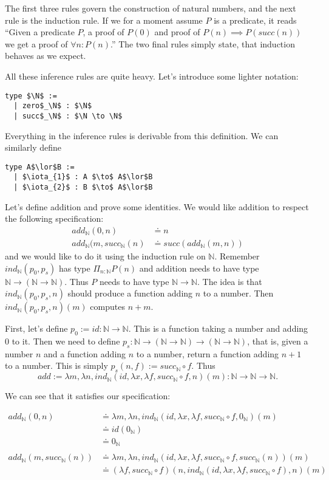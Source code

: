 \documentclass[a4paper, 12pt]{article}
\newcommand{\N}{\mathbb{N}}
\theoremstyle{changedot}
\theoremstyle{changedotbreak}
\theoremstyle{nonumberplain}
\begin{document}
The first three rules govern the construction of natural numbers, and the next rule is the induction rule. If we for a moment assume $P$ is a predicate, it reads ``Given a predicate $P$, a proof of $P(0)$ and proof of $P(n) \implies P(succ(n))$ we get a proof of $\forall n: P(n)$.'' The two final rules simply state, that induction behaves as we expect.

All these inference rules are quite heavy. Let's introduce some lighter notation:

\begin{lstlisting}[mathescape=true]
  type $\N$ :=
  | zero$_\N$ : $\N$
  | succ$_\N$ : $\N \to \N$
\end{lstlisting}

Everything in the inference rules is derivable from this definition. We can similarly define

\begin{lstlisting}[mathescape=true]
  type A$\lor$B :=
  | $\iota_{1}$ : A $\to$ A$\lor$B
  | $\iota_{2}$ : B $\to$ A$\lor$B
\end{lstlisting}

Let's define addition and prove some identities. We would like addition to respect the following specification:
\begin{align*}
  \mathit{add}_{\N} (0, n) &\doteq n \\
  \mathit{add}_{\N} (m, succ_{\N} (n) &\doteq succ(\mathit{add}_{\N}(m, n))
\end{align*}
and we would like to do it using the induction rule on $\N$. Remember $ind_{\N}(p_{0}, p_{s})$ has type $\Pi_{n:\N} P(n)$ and addition needs to have type $\N \to (\N \to \N)$. Thus $P$ needs to have type $\N \to \N$. The idea is that $ind_{\N}(p_{0}, p_{s}, n)$ should produce a function adding $n$ to a number. Then $ind_{\N}(p_{0}, p_{s}, n)(m)$ computes $n+m$.

First, let's define $p_{0} := id : \N \to \N$. This is a function taking a number and adding 0 to it. Then we need to define $p_{s} : \N \to (\N \to \N) \to (\N \to \N)$, that is, given a number $n$ and a function adding $n$ to a number, return a function adding $n+1$ to a number. This is simply $p_{s}(n, f) := succ_{\N} \circ f$. Thus \[add := \lambda m, \lambda n, ind_{\N}(id, \lambda x, \lambda f, succ_{\N} \circ f, n)(m) : \N \to \N \to \N.\]

We can see that it satisfies our specification:

\begin{align*}
  add_{\N}(0, n) &\doteq \lambda m, \lambda n, ind_{\N}(id, \lambda x, \lambda f, succ_{\N} \circ f, 0_{\N})(m) \\
                 &\doteq id(0_{\N}) \\
                 &\doteq 0_{\N} \\ \\
  add_{\N}(m, succ_{\N}(n)) &\doteq \lambda m, \lambda n, ind_{\N}(id, \lambda x, \lambda f, succ_{\N} \circ f, succ_{\N}(n))(m) \\
                 &\doteq (\lambda f, succ_{\N} \circ f)(n, ind_{\N}(id, \lambda x,\lambda f, succ_{\N} \circ f), n)(m) \\
\end{align*}
\end{document}
